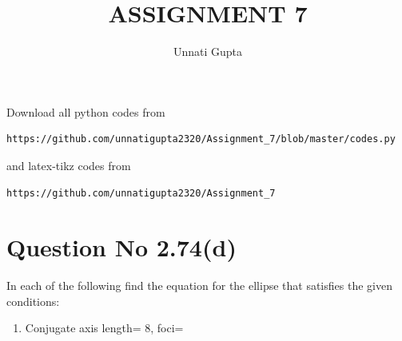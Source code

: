 \documentclass[journal,12pt,twocolumn]{IEEEtran}
\begin{document}
     \def\centbox#1{\makebox[0in]{#1}}
     \def\topbox#1{\raisebox{-\baselineskip}[0in][0in]{#1}}
     \def\midbox#1{\raisebox{-0.5\baselineskip}[0in][0in]{#1}}
\vspace{3cm}
\title{ASSIGNMENT 7}
\author{Unnati Gupta}
\maketitle
\newpage
\bigskip
\renewcommand{\thefigure}{\theenumi}
\renewcommand{\thetable}{\theenumi}
Download all python codes from 
\begin{lstlisting}
https://github.com/unnatigupta2320/Assignment_7/blob/master/codes.py
\end{lstlisting}
%
and latex-tikz codes from 
%
\begin{lstlisting}
https://github.com/unnatigupta2320/Assignment_7
\end{lstlisting}
%
\section{Question No 2.74(d)}
In each of the following find the equation for the ellipse that satisfies the given conditions:
\begin{enumerate}[label=\alph*.]
\item Conjugate axis length= 8,
foci= 
\end{enumerate}
%
\end{document}
